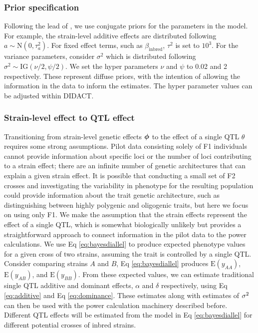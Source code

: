 \subsubsection{Prior specification}

Following the lead of \citep{Lenarcic2012}, we use conjugate priors for the parameters in the model. For example, the strain-level additive effects are distributed following $a \sim \text{N}(0, \tau_{a}^{2})$. For fixed effect terms, such as $\beta_{\text{inbred}}$, $\tau^{2}$ is set to $10^{3}$. For the variance parameters, consider $\sigma^{2}$ which is distributed following $\sigma^{2} \sim \text{IG}(\nu/2, \psi/2)$. We set the hyper parameters $\nu$ and $\psi$ to 0.02 and 2 respectively. These represent diffuse priors, with the intention of allowing the information in the data to inform the estimates. The hyper parameter values can be adjusted within DIDACT.

\subsubsection{Strain-level effect to QTL effect}

Transitioning from strain-level genetic effects $\boldsymbol{\phi}$ to the effect of a single QTL $\theta$ requires some strong assumptions. Pilot data consisting solely of F1 individuals cannot provide information about specific loci or the number of loci contributing to a strain effect; there are an infinite number of genetic architectures that can explain a given strain effect. It is possible that conducting a small set of F2 crosses and investigating the variability in phenotype for the resulting population could provide information about the trait genetic architecture, such as distinguishing between highly polygenic and oligogenic traits, but here we focus on using only F1. We make the assumption that the strain effects represent the effect of a single QTL, which is somewhat biologically unlikely but provides a straightforward approach to connect information in the pilot data to the power calculations. We use Eq \ref{eq:bayesdiallel} to produce expected phenotype values for a given cross of two strains, assuming the trait is controlled by a single QTL. Consider comparing strains $A$ and $B$, Eq \ref{eq:bayesdiallel} produces $\text{E}(y_{AA})$, $\text{E}(y_{AB})$, and $\text{E}(y_{BB})$. From these expected values, we can estimate traditional single QTL additive and dominant effects, $\alpha$ and $\delta$ respectively, using Eq \ref{eq:additive} and Eq \ref{eq:dominance}. These estimates along with estimates of $\sigma^{2}$ can then be used with the power calculation machinery described before. Different QTL effects will be estimated from the model in Eq \ref{eq:bayesdiallel} for different potential crosses of inbred strains. 

